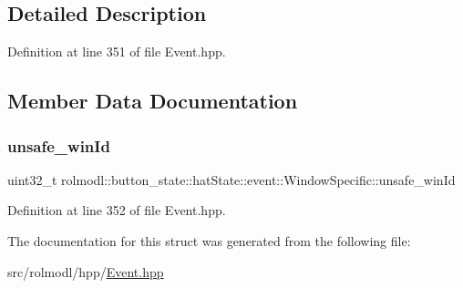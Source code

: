 \subsection{Detailed Description}


Definition at line 351 of file Event.\+hpp.



\subsection{Member Data Documentation}
\mbox{\label{structrolmodl_1_1button__state_1_1hat_state_1_1event_1_1_window_specific_abd819e10bb3e44e3236ef55d4d0ab2e9}} 
\subsubsection{\texorpdfstring{unsafe\_winId}{unsafe\_winId}}
{\footnotesize\ttfamily uint32\+\_\+t rolmodl\+::button\+\_\+state\+::hat\+State\+::event\+::\+Window\+Specific\+::unsafe\+\_\+win\+Id}



Definition at line 352 of file Event.\+hpp.



The documentation for this struct was generated from the following file\+:\begin{DoxyCompactItemize}
\item 
src/rolmodl/hpp/\mbox{\hyperlink{_event_8hpp}{Event.\+hpp}}\end{DoxyCompactItemize}
